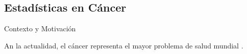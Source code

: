 \documentclass[10pt]{beamer}
\newcommand{\1}{
	\setbeamertemplate{background}{
		\texttt{[image: img/1]}
		\tikz[overlay] \fill[fill opacity=0.75,fill=white] (0,0) rectangle (-\paperwidth,\paperheight);
	}
}
\begin{document}
\subsection{Estadísticas en Cáncer}


\begin{frame}{Contexto y Motivación}{}
	\begin{block}{}
		An la actualidad, el cáncer representa el mayor problema de salud mundial \cite{siegel2023cancer}.
	\end{block}

\end{frame}



\end{document}
